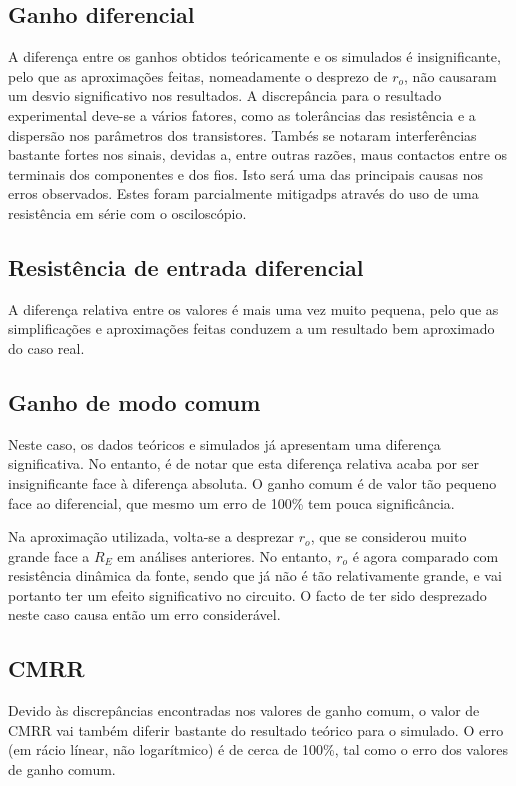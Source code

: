 \documentclass[a4paper,2pt]{report}
\begin{document}
\subsection{Ganho diferencial}
\par A diferença entre os ganhos obtidos teóricamente e os simulados é insignificante, pelo que as aproximações feitas, nomeadamente o desprezo de \(r_o\), não causaram um desvio significativo nos resultados. A discrepância para o resultado experimental deve-se a vários fatores, como as tolerâncias das resistência e a dispersão nos parâmetros dos transistores. Tambés se notaram interferências bastante fortes nos sinais, devidas a, entre outras razões, maus contactos entre os terminais dos componentes e dos fios. Isto será uma das principais causas nos erros observados. Estes foram parcialmente mitigadps através do uso de uma resistência em série com o osciloscópio.

\subsection{Resistência de entrada diferencial}
\par A diferença relativa entre os valores é mais uma vez muito pequena, pelo que as simplificações e aproximações feitas conduzem a um resultado bem aproximado do caso real.

\subsection{Ganho de modo comum}
\par Neste caso, os dados teóricos e simulados já apresentam uma diferença significativa. No entanto, é de notar que esta diferença relativa acaba por ser insignificante face à diferença absoluta. O ganho comum é de valor tão pequeno face ao diferencial, que mesmo um erro de 100\% tem pouca significância. 
\par Na aproximação utilizada, volta-se a desprezar \(r_o\), que se considerou muito grande face a \(R_E\) em análises anteriores. No entanto, \(r_o\) é agora comparado com resistência dinâmica da fonte, sendo que já não é tão relativamente grande, e vai portanto ter um efeito significativo no circuito. O facto de ter sido desprezado neste caso causa então um erro considerável.

\subsection{CMRR}
\par Devido às discrepâncias encontradas nos valores de ganho comum, o valor de CMRR vai também diferir bastante do resultado teórico para o simulado. O erro (em rácio línear, não logarítmico) é de cerca de 100\%, tal como o erro dos valores de ganho comum.
\end{document}
